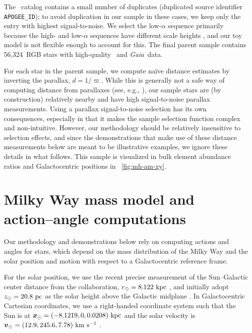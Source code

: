 \documentclass[modern]{aastex63}
\newcommand{\gaia}{\textsl{Gaia}}
\newcommand{\apogee}{\acronym{APOGEE}}
\newcommand{\nstars}{56,324}
\begin{document}
The \apogee\ catalog contains a small number of duplicates (duplicated source
identifier \texttt{APOGEE\_ID}); to avoid duplication in our sample in these
cases, we keep only the entry with highest signal-to-noise.
We select the low-$\alpha$ sequence primarily because the high- and low-$\alpha$
sequences have different scale heights \citep[e.g.,][]{Bovy:2016}, and our toy
model is not flexible enough to account for this.
The final parent sample contains \nstars\ RGB stars with high-quality \apogee\
and \gaia\ data.

For each star in the parent sample, we compute na\"ive distance estimates by
inverting the parallax, $d = 1/\varpi$.
While this is generally not a safe way of computing distance from parallaxes
(see, e.g., \citealt{Bailer-Jones:2015}), our sample stars are (by construction)
relatively nearby and have high signal-to-noise parallax measurements.
Using a parallax signal-to-noise selection has its own consequences, especially
in that it makes the sample selection function complex and non-intuitive.
However, our methodology should be relatively insensitive to selection effects,
and since the demonstrations that make use of these distance measurements below
are meant to be illustrative examples, we ignore these details in what follows.
This sample is visualized in bulk element abundance ratios and Galactocentric
positions in \figurename~\ref{fig:mh-am-xy}.


\section{Milky Way mass model and action--angle computations}
\label{sec:mw-model}

Our methodology and demonstrations below rely on computing actions and angles
for stars, which depend on the mass distribution of the Milky Way and the solar
position and motion with respect to a Galactocentric reference frame.

For the solar position, we use the recent precise measurement of the
Sun--Galactic center distance from the \acronym{GRAVITY} collaboration, $r_\odot
= 8.122~\mathrm{kpc}$ \citep{Gravity:2018}, and initially adopt $z_\odot = 20.8~\mathrm{pc}$ as
the solar height above the Galactic midplane \citep{Bennett:2019}.
In Galactocentric Cartesian coordinates, we use a right-handed coordinate system
such that the Sun is at $\boldsymbol{x}_\odot = (-8.1219, 0, 0.0208)~\mathrm{kpc}$ and the
solar velocity is $\boldsymbol{v}_\odot = (12.9, 245.6, 7.78)~\mathrm{km}~\mathrm{s}^{-1}$ \citep{Drimmel:2018,
Reid:2004, Gravity:2018}.
\end{document}
